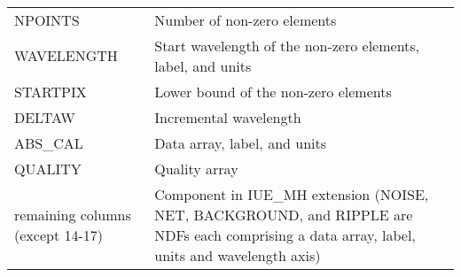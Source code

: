 \documentclass[twoside,11pt]{starlink}
\begin{document}
{{{{            \\[\medskipamount]
            \begin{tabular}{p{32mm}p{90mm}}
            NPOINTS            &   Number of non-zero elements \\
            WAVELENGTH         &   Start wavelength of the non-zero
                                   elements, label, and units \\
            STARTPIX           &   Lower bound of the non-zero elements \\
            DELTAW             &   Incremental wavelength \\
            ABS\_CAL           &   Data array, label, and units \\
            QUALITY            &   Quality array \\
            remaining columns (except 14-17) &   Component in IUE\_MH extension
                                   (NOISE, NET, BACKGROUND, and RIPPLE are NDFs
                                   each comprising a data array, label,
                                   units and wavelength axis) \\
            \end{tabular}

}}}}
\end{document}
